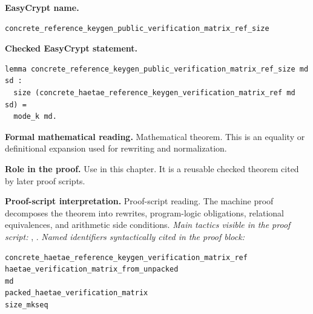 \begin{formaltheorem}
\noindent\textbf{EasyCrypt name.}
\begin{lstlisting}[language=EasyCrypt,basicstyle=\ttfamily\scriptsize]
concrete_reference_keygen_public_verification_matrix_ref_size
\end{lstlisting}
\noindent\textbf{Checked EasyCrypt statement.}
\begin{lstlisting}[language=EasyCrypt,basicstyle=\ttfamily\scriptsize]
lemma concrete_reference_keygen_public_verification_matrix_ref_size md sd :
  size (concrete_haetae_reference_keygen_verification_matrix_ref md sd) =
  mode_k md.
\end{lstlisting}
\noindent\textbf{Formal mathematical reading.}
Mathematical theorem. This is an equality or definitional expansion used for rewriting and normalization.

\noindent\textbf{Role in the proof.}
Use in this chapter. It is a reusable checked theorem cited by later proof scripts.

\noindent\textbf{Proof-script interpretation.}
Proof-script reading. The machine proof decomposes the theorem into rewrites, program-logic obligations, relational equivalences, and arithmetic side conditions.
\emph{Main tactics visible in the proof script:} , .
\emph{Named identifiers syntactically cited in the proof block:}
\begin{lstlisting}[language=EasyCrypt,basicstyle=\ttfamily\scriptsize]
concrete_haetae_reference_keygen_verification_matrix_ref
haetae_verification_matrix_from_unpacked
md
packed_haetae_verification_matrix
size_mkseq
\end{lstlisting}

\end{formaltheorem}

